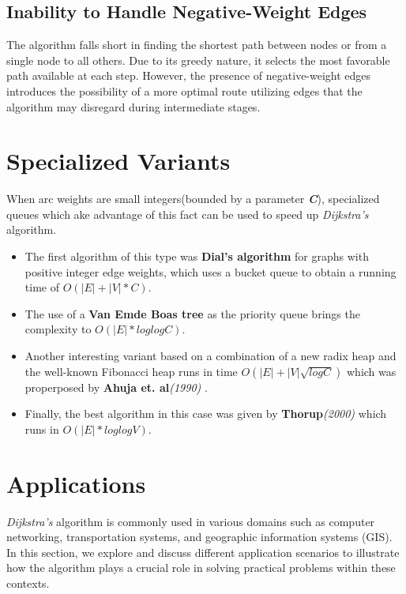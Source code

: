 \documentclass[12pt, a4paper]{article}
\begin{document}
\subsection{Inability to Handle Negative-Weight Edges}

\par The algorithm falls short in finding the shortest path between nodes or from a single node to all others. Due to its greedy nature, it selects the most favorable path available at each step. However, the presence of negative-weight edges introduces the possibility of a more optimal route utilizing edges that the algorithm may disregard during intermediate stages.


\section{Specialized Variants}
When arc weights are small integers(bounded by a parameter \textbf{\textit{C}}), specialized queues which ake advantage of this fact can be used to speed up \textit{Dijkstra's} algorithm.
\begin{itemize}
    \item The first algorithm of this type was \textbf{Dial's algorithm} \cite{dial1969algorithm} for graphs with positive integer edge weights, which uses a bucket queue to obtain a running time of {$O(|E| + |V|*C)$}.
    \item  The use of a \textbf{Van Emde Boas tree} \cite{vanvan} as the priority queue brings the complexity to {$O(|E|  * loglogC)$}.

    \item Another interesting variant based on a combination of a new radix heap and the well-known Fibonacci heap runs in time {$O(|E| + |V| \sqrt{logC})$} which was properposed by \textbf{Ahuja et. al}\textit{(1990)}  \cite{ahuja1990faster}.

    \item Finally, the best algorithm in this case was given by \textbf{Thorup}\textit{(2000)} \cite{thorup2000ram} which runs in {$O(|E|  * loglogV)$}.


\end{itemize}



\section{Applications}



\textit{Dijkstra's} algorithm is commonly used in various domains such as computer networking, transportation systems, and geographic information systems (GIS). In this section, we explore and discuss different application scenarios to illustrate how the algorithm plays a crucial role in solving practical problems within these contexts.
\end{document}
